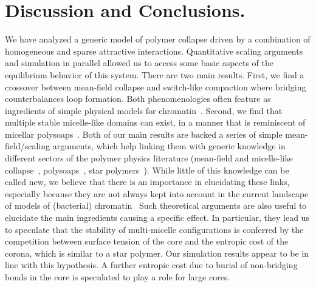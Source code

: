 \documentclass[
preprint,
a4paper,
12pt,
superscriptaddress,
pre]{revtex4}
\begin{document}


\section{Discussion and Conclusions. }
\label{sec:Disc}


We have analyzed a generic model of polymer collapse driven by a
combination of homogeneous and sparse attractive interactions.
Quantitative scaling arguments and simulation in parallel allowed us
to access some basic aspects of the equilibrium behavior of this
system.
%
%
There are two main results. 
First, we find a crossover between mean-field collapse and switch-like
compaction where bridging counterbalances loop formation. Both
phenomenologies often feature as ingredients of simple physical models
for
chromatin~\cite{Marenduzzo2006c,Brackley2013,Barbieri2013b,Mirny2011}.
Second, we find that multiple stable micelle-like domains can exist,
in a manner that is reminiscent of micellar
polysoaps~\cite{Borisov1996}.
%
Both of our main results are backed a series of simple
mean-field/scaling arguments, which help linking them with generic
knowledge in different sectors of the polymer physics literature
(mean-field and micelle-like
collapse~\cite{DeGennes1975,Marenduzzo2006c},
polysoaps~\cite{Borisov1996}, star polymers~\cite{Daoud1982,Hsu2004}).
While little of this knowledge can be called new, we believe that
there is an importance in elucidating these links, especially because
they are not always kept into account in the current landscape of
models of (bacterial) chromatin~\cite{Benza2012,Barbieri2013a}
Such theoretical arguments are also useful to elucidate the main
ingredients causing a specific effect. In particular, they lead us to
speculate that the stability of multi-micelle configurations is
conferred by the competition between surface tension of the core and
the entropic cost of the corona, which is similar to a star
polymer. Our simulation results appear to be in line with this
hypothesis. A further entropic cost due to burial of non-bridging
bonds in the core is speculated to play a role for  large cores.
\end{document}
